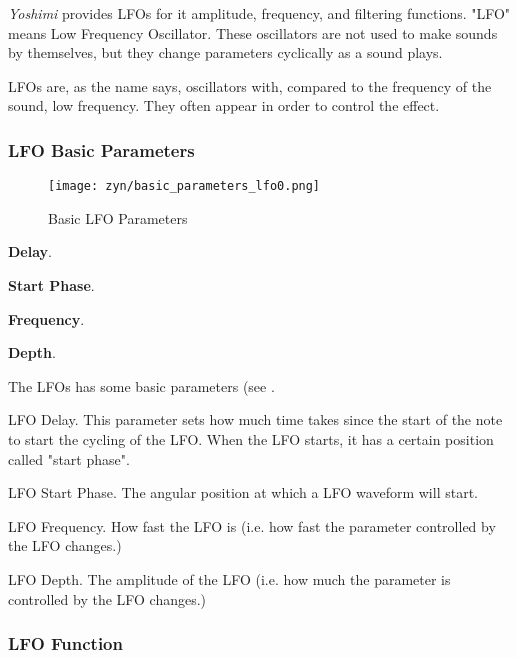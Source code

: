    \textsl{Yoshimi} provides LFOs for it amplitude, frequency, and filtering
   functions.
   "LFO" means Low Frequency Oscillator. These oscillators are not used to make
   sounds by themselves, but they change parameters cyclically as a sound
   plays.

   LFOs are, as the name says, oscillators with, compared to the frequency of
   the sound, low frequency. They often appear in order to control the
   effect.

\subsubsection{LFO Basic Parameters}
\label{subsubsec:lfo_basic_parameters}

\begin{figure}[H]
   \centering 
   \texttt{[image: zyn/basic\_parameters\_lfo0.png]}
   \caption[Basic LFO Parameters]{Basic LFO Parameters}
   \label{fig:basic_parameters_lfo} 
\end{figure}

   \begin{enumber}
      \item \textbf{Delay}.
      \item \textbf{Start Phase}.
      \item \textbf{Frequency}.
      \item \textbf{Depth}.
   \end{enumber}

   The LFOs has some basic parameters (see
   .

   \setcounter{ItemCounter}{0}      %

   LFO Delay.
   This parameter sets how much time takes since the start of the note to
   start the cycling of the LFO.
   When the LFO starts, it has a certain position called "start phase".

   LFO Start Phase.
   The angular position at which a LFO waveform will start.

   LFO Frequency.
   How fast the LFO is (i.e. how fast the parameter controlled by
   the LFO changes.)

   LFO Depth.
   The amplitude of the LFO (i.e. how much the parameter is controlled by
   the LFO changes.)

\subsubsection{LFO Function}
\label{subsubsec:lfo_function}

